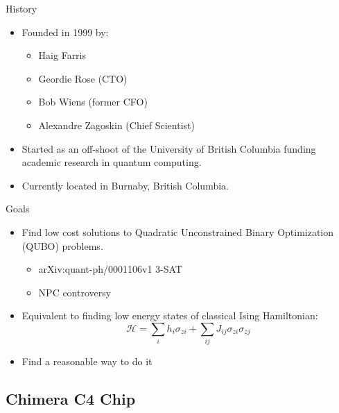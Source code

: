 \documentclass{beamer}
\begin{document}
\begin{frame}{History}
 \begin{itemize}
  \item Founded in 1999 by:
    \begin{itemize}
     \item Haig Farris
     \item Geordie Rose (CTO)
     \item Bob Wiens (former CFO)
     \item Alexandre Zagoskin (Chief Scientist)
    \end{itemize}
   \item Started as an off-shoot of the University of British Columbia funding academic research in quantum computing.
   \item Currently located in Burnaby, British Columbia.

 \end{itemize}

\end{frame}

\begin{frame}{Goals}
 
 \begin{itemize}
  \item Find low cost solutions to Quadratic Unconstrained Binary Optimization (QUBO) problems.
  \begin{itemize}
   \item arXiv:quant-ph/0001106v1 3-SAT
   \item NPC controversy
  \end{itemize}
  \pause
  \item Equivalent to finding low energy states of classical Ising Hamiltonian: \[\mathcal{H} = \displaystyle\sum\limits_{i}h_i\sigma_{zi} + \displaystyle\sum\limits_{ij}J_{ij}\sigma_{zi}\sigma_{zj}\]
  \pause
  \item Find a reasonable way to do it
 \end{itemize}

\end{frame}

\subsection{Chimera C4 Chip}
\end{document}
